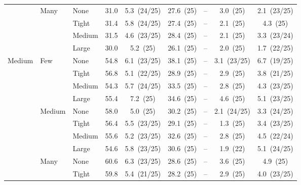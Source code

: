 \begin{table}[htbp]
{\begin{tabular}{lll c ccccc}
 & \multirow{4}{*}{\small Many} & {\small None} & 31.0 & 5.3~{\scriptsize(24/25)} & 27.6~{\scriptsize(25)} & -- & 3.0~{\scriptsize(25)} & 2.1~{\scriptsize(23/25)} \\
 &  & {\small Tight} & 31.4 & 5.8~{\scriptsize(24/25)} & 27.4~{\scriptsize(25)} & -- & 2.1~{\scriptsize(25)} & 4.3~{\scriptsize(25)} \\
 &  & {\small Medium} & 31.5 & 4.6~{\scriptsize(23/25)} & 28.4~{\scriptsize(25)} & -- & 2.1~{\scriptsize(25)} & 3.3~{\scriptsize(23/24)} \\
 &  & {\small Large} & 30.0 & 5.2~{\scriptsize(25)} & 26.1~{\scriptsize(25)} & -- & 2.0~{\scriptsize(25)} & 1.7~{\scriptsize(22/25)} \\
\midrule
\multirow{12}{*}{\small Medium} & \multirow{4}{*}{\small Few} & {\small None} & 54.8 & 6.1~{\scriptsize(23/25)} & 38.1~{\scriptsize(25)} & -- & 3.1~{\scriptsize(23/25)} & 6.7~{\scriptsize(19/25)} \\
 &  & {\small Tight} & 56.8 & 5.1~{\scriptsize(22/25)} & 28.9~{\scriptsize(25)} & -- & 2.9~{\scriptsize(25)} & 3.8~{\scriptsize(21/25)} \\
 &  & {\small Medium} & 54.3 & 5.7~{\scriptsize(24/25)} & 33.5~{\scriptsize(25)} & -- & 2.8~{\scriptsize(25)} & 4.3~{\scriptsize(23/25)} \\
 &  & {\small Large} & 55.4 & 7.2~{\scriptsize(25)} & 34.6~{\scriptsize(25)} & -- & 4.6~{\scriptsize(25)} & 5.1~{\scriptsize(23/25)} \\
 & \multirow{4}{*}{\small Medium} & {\small None} & 58.0 & 5.0~{\scriptsize(25)} & 30.2~{\scriptsize(25)} & -- & 2.1~{\scriptsize(24/25)} & 3.3~{\scriptsize(24/25)} \\
 &  & {\small Tight} & 56.4 & 5.5~{\scriptsize(23/25)} & 29.1~{\scriptsize(25)} & -- & 1.3~{\scriptsize(25)} & 3.4~{\scriptsize(23/25)} \\
 &  & {\small Medium} & 55.6 & 5.2~{\scriptsize(23/25)} & 32.6~{\scriptsize(25)} & -- & 2.8~{\scriptsize(25)} & 4.5~{\scriptsize(22/24)} \\
 &  & {\small Large} & 54.6 & 5.8~{\scriptsize(23/25)} & 30.6~{\scriptsize(25)} & -- & 1.9~{\scriptsize(22)} & 5.1~{\scriptsize(24/25)} \\
 & \multirow{4}{*}{\small Many} & {\small None} & 60.6 & 6.3~{\scriptsize(23/25)} & 28.6~{\scriptsize(25)} & -- & 3.6~{\scriptsize(25)} & 4.9~{\scriptsize(25)} \\
 &  & {\small Tight} & 59.8 & 5.4~{\scriptsize(21/25)} & 28.2~{\scriptsize(25)} & -- & 2.9~{\scriptsize(25)} & 4.0~{\scriptsize(23/25)} \\

\end{tabular}}
\end{table}
